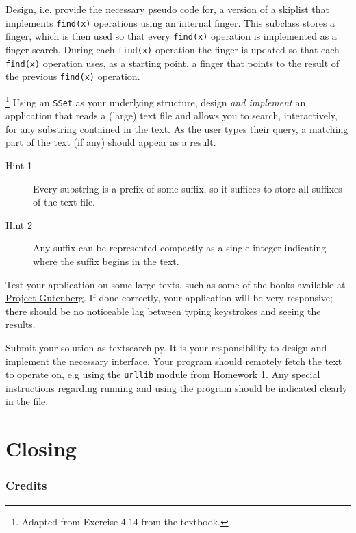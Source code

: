 \documentclass[addpoints]{exam}
\begin{document}
\begin{questions}
  Design, i.e. provide the necessary pseudo code for, a version of a skiplist that implements \texttt{find(x)} operations using an internal finger. This subclass stores a finger, which is then used so that every \texttt{find(x)} operation is implemented as a finger search. During each \texttt{find(x)} operation the finger is updated so that each \texttt{find(x)} operation uses, as a starting point, a finger that points to the result of the previous \texttt{find(x)} operation.
  \begin{solution}
  \end{solution}

\footnote{Adapted from Exercise 4.14 from the textbook.}
  Using an \texttt{SSet} as your underlying structure, design \textit{and implement} an application that reads a (large) text file and allows you to search, interactively, for any substring contained in the text. As the user types their query, a matching part of the text (if any) should appear as a result.
  \begin{description}
  \item[Hint 1] Every substring is a prefix of some suffix, so it suffices to store all suffixes of the text file.
  \item[Hint 2] Any suffix can be represented compactly as a single integer indicating where the suffix begins in the text.
  \end{description}
  
  Test your application on some large texts, such as some of the books available at \href{http://www.gutenberg.org/}{Project Gutenberg}. If done correctly, your application will be very responsive; there should be no noticeable lag between typing keystrokes and seeing the results.

  Submit your solution as textsearch.py. It is your responsibility to design and implement the necessary interface. Your program should remotely fetch the text to operate on, e.g using the \texttt{urllib} module from Homework 1. Any special instructions regarding running and using the program should be indicated clearly in the file.
  
\end{questions}

\part{Closing}
  
\section*{Credits}
\end{document}

